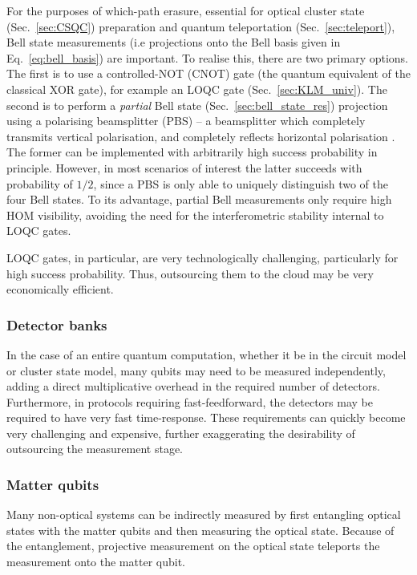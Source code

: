 \documentclass[aps,rmp,twocolumn,amsmath,amssymb,nofootinbib,superscriptaddress,longbibliography,floatfix]{revtex4-1}
\begin{document}
For the purposes of which-path erasure, essential for optical cluster state (Sec.~\ref{sec:CSQC}) preparation and quantum teleportation (Sec.~\ref{sec:teleport}), Bell state measurements (i.e projections onto the Bell basis given in Eq.~\ref{eq:bell_basis}) are important. To realise this, there are two primary options. The first is to use a controlled-NOT (CNOT) gate (the quantum equivalent of the classical XOR gate), for example an LOQC gate (Sec.~\ref{sec:KLM_univ}). The second is to perform a \emph{partial} Bell state (Sec.~\ref{sec:bell_state_res}) projection using a polarising beamsplitter (PBS) -- a beamsplitter which completely transmits vertical polarisation, and completely reflects horizontal polarisation \cite{bib:BraunsteinMann95}. The former can be implemented with arbitrarily high success probability in principle. However, in most scenarios of interest the latter succeeds with probability of $1/2$, since a PBS is only able to uniquely distinguish two of the four Bell states. To its advantage, partial Bell measurements only require high HOM visibility, avoiding the need for the interferometric stability internal to LOQC gates.

LOQC gates, in particular, are very technologically challenging, particularly for high success probability. Thus, outsourcing them to the cloud may be very economically efficient.

%
%

\subsubsection{Detector banks}

In the case of an entire quantum computation, whether it be in the circuit model or cluster state model, many qubits may need to be measured independently, adding a direct multiplicative overhead in the required number of detectors. Furthermore, in protocols requiring fast-feedforward, the detectors may be required to have very fast time-response. These requirements can quickly become very challenging and expensive, further exaggerating the desirability of outsourcing the measurement stage.

%
%

\subsubsection{Matter qubits}

Many non-optical systems can be indirectly measured by first entangling optical states with the matter qubits and then measuring the optical state. Because of the entanglement, projective measurement on the optical state teleports the measurement onto the matter qubit.
\end{document}

